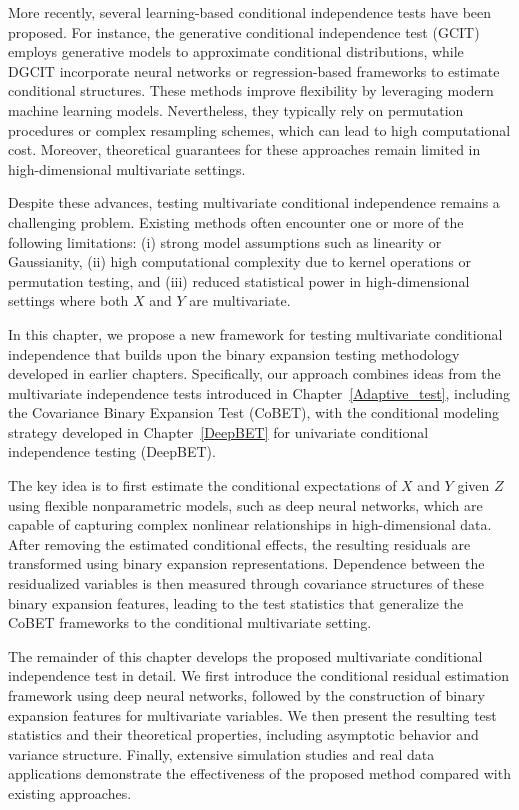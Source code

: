 \documentclass[12pt,reqno,oneside]{amsbook}
\theoremstyle{definition}
\theoremstyle{remark}
\begin{document}
More recently, several learning-based conditional independence tests have 
been proposed. For instance, the generative conditional independence test 
(GCIT) \cite{bellot2019conditional} employs generative models to approximate conditional 
distributions, while DGCIT \cite{shi2021double} incorporate 
neural networks or regression-based frameworks to estimate conditional 
structures. These methods improve flexibility by leveraging modern machine 
learning models. Nevertheless, they typically rely on permutation procedures 
or complex resampling schemes, which can lead to high computational cost. 
Moreover, theoretical guarantees for these approaches remain limited in 
high-dimensional multivariate settings.

Despite these advances, testing multivariate conditional independence remains 
a challenging problem. Existing methods often encounter one or more of the 
following limitations: (i) strong model assumptions such as linearity or 
Gaussianity, (ii) high computational complexity due to kernel operations or 
permutation testing, and (iii) reduced statistical power in high-dimensional 
settings where both $X$ and $Y$ are multivariate.

In this chapter, we propose a new framework for testing multivariate 
conditional independence that builds upon the binary expansion testing 
methodology developed in earlier chapters. Specifically, our approach 
combines ideas from the multivariate independence tests introduced in 
Chapter~\ref{Adaptive_test}, including the Covariance Binary 
Expansion Test (CoBET), with the conditional modeling 
strategy developed in Chapter~\ref{DeepBET} for univariate conditional 
independence testing (DeepBET).

The key idea is to first estimate the conditional expectations of $X$ and 
$Y$ given $Z$ using flexible nonparametric models, such as deep neural 
networks, which are capable of capturing complex nonlinear relationships 
in high-dimensional data. After removing the estimated conditional effects, 
the resulting residuals are transformed using binary expansion 
representations. Dependence between the residualized variables is then 
measured through covariance structures of these binary expansion features, 
leading to the test statistics that generalize the CoBET
frameworks to the conditional multivariate setting.


The remainder of this chapter develops the proposed multivariate conditional 
independence test in detail. We first introduce the conditional residual 
estimation framework using deep neural networks, followed by the construction 
of binary expansion features for multivariate variables. We then present the 
resulting test statistics and their theoretical properties, including 
asymptotic behavior and variance structure. Finally, extensive simulation 
studies and real data applications demonstrate the effectiveness of the 
proposed method compared with existing approaches.
\end{document}
